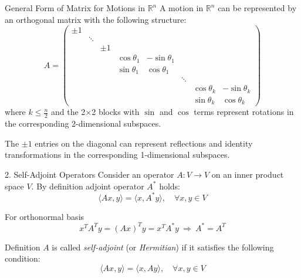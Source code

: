 \documentclass[fullscreen=true, bookmarks=true, hyperref={pdfencoding=unicode}]{beamer}
\begin{document}
\begin{frame}{General Form of Matrix for Motions in $\mathbb{R}^n$}
  A motion in $\mathbb{R}^n$ can be represented by an orthogonal matrix with the following structure:
  \[
  A = \begin{pmatrix}
    \pm 1 & & & & & & & \\
      & \ddots & & & & & & \\
      & & \pm 1 & & & & & \\
      & & & \cos\theta_1 & -\sin\theta_1 & & & \\
      & & & \sin\theta_1 & \cos\theta_1 & & & \\
      & & & & & \ddots & & \\
      & & & & & & \cos\theta_k & -\sin\theta_k \\
      & & & & & & \sin\theta_k & \cos\theta_k
  \end{pmatrix}
  \]
  where $k \le \frac{n}{2}$ and the 2$\times$2 blocks with $\sin$ and $\cos$ terms represent rotations in the corresponding 2-dimensional subspaces.

  The $\pm 1$ entries on the diagonal can represent reflections and 
  identity transformations in the corresponding 1-dimensional subspaces.
\end{frame}


\begin{frame}{2. Self-Adjoint Operators}
  Consider an operator $A: V \to V$ on an inner product space $V$. 
  By definition adjoint operator $A^*$ holds:
  \[
  \langle Ax, y \rangle = \langle x, A^*y \rangle, \quad \forall x, y \in V
  \]
    
  For orthonormal basis
  \[
  x^TA^Ty = (Ax)^T y = x^TA^*y\ \Rightarrow\ A^* = A^T
  \]

  \begin{block}{Definition}
    $A$ is called \textit{self-adjoint} (or \textit{Hermitian}) if 
    it satisfies the following condition:
    \[
    \langle Ax, y \rangle = \langle x, Ay \rangle, \quad \forall x, y \in V
    \]      
  \end{block}

\end{frame}
\end{document}
